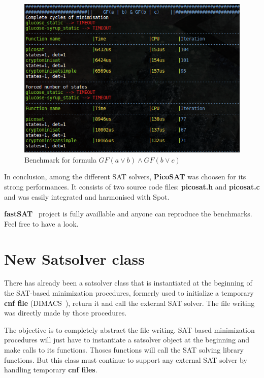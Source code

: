 \begin{figure}[H]
 \centering
 \includegraphics[scale=0.7]{img/satchoose_3.png}
 \caption{Benchmark for formula $GF(a \lor b) \land GF(b \lor c)$}
 \label{fig:satchoose_3}
\end{figure}

\noindent In conclusion, among the different SAT solvers, \textbf{PicoSAT} was choosen for its strong
performances. It consists of two source code files: \textbf{picosat.h} and \textbf{picosat.c} and was
easily integrated and harmonised with Spot.

\textbf{fastSAT}~\cite{5} project is fully availlable and anyone can reproduce the benchmarks. Feel free to
have a look.

\section{New Satsolver class}
There has already been a satsolver class that is instantiated at the beginning of the SAT-based minimization
procedures, formerly used to initialize a temporary \textbf{cnf file} (DIMACS~\cite{18}), return
it and call the external SAT solver. The file writing was directly made by those procedures.

\noindent The objective is to completely abstract the file writing. SAT-based minimization procedures will
just have to instantiate a satsolver object at the beginning and make calls to its functions. Thoses
functions will call the SAT solving library functions. But this class must continue to support any external
SAT solver by handling temporary \textbf{cnf files}.\\

